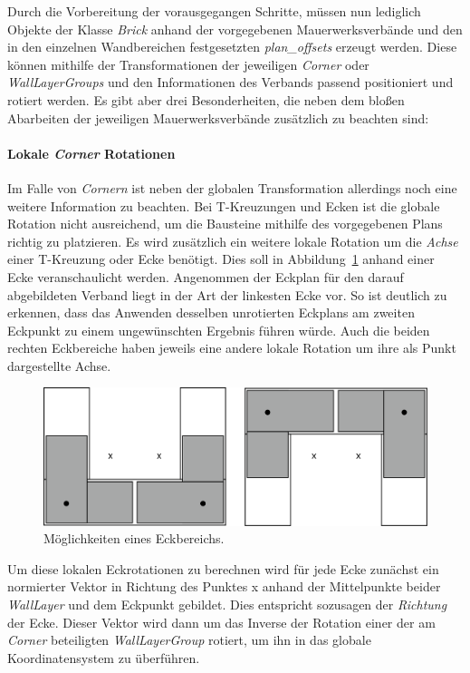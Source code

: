 Durch die Vorbereitung der vorausgegangen Schritte, müssen nun lediglich Objekte der Klasse \textit{Brick} anhand der vorgegebenen Mauerwerksverbände und den in den einzelnen Wandbereichen festgesetzten \textit{plan\_offsets} erzeugt werden.
Diese können mithilfe der Transformationen der jeweiligen \textit{Corner} oder \textit{WallLayerGroups} und den Informationen des Verbands passend positioniert und rotiert werden.
Es gibt aber drei Besonderheiten, die neben dem bloßen Abarbeiten der jeweiligen Mauerwerksverbände zusätzlich zu beachten sind:

\paragraph*{Lokale \textit{Corner} Rotationen}
Im Falle von \textit{Cornern} ist neben der globalen Transformation allerdings noch eine weitere Information zu beachten.
Bei T-Kreuzungen und Ecken ist die globale Rotation nicht ausreichend, um die Bausteine mithilfe des vorgegebenen Plans richtig zu platzieren.
Es wird zusätzlich ein weitere lokale Rotation um die \textit{Achse} einer T-Kreuzung oder Ecke benötigt.
Dies soll in Abbildung~\ref{fig:real:eckrotationen} anhand einer Ecke veranschaulicht werden.
Angenommen der Eckplan für den darauf abgebildeten Verband liegt in der Art der linkesten Ecke vor.
So ist deutlich zu erkennen, dass das Anwenden desselben unrotierten Eckplans am zweiten Eckpunkt zu einem ungewünschten Ergebnis führen würde.
Auch die beiden rechten Eckbereiche haben jeweils eine andere lokale Rotation um ihre als Punkt dargestellte Achse.
\begin{figure}[hb]
  \centering
  \includegraphics[width=0.9\columnwidth]{fig/Eckrotationen.png}
  \caption{Möglichkeiten eines Eckbereichs.}
  \label{fig:real:eckrotationen}
\end{figure}
Um diese lokalen Eckrotationen zu berechnen wird für jede Ecke zunächst ein normierter Vektor in Richtung des Punktes x anhand der Mittelpunkte beider \textit{WallLayer} und dem Eckpunkt gebildet.
Dies entspricht sozusagen der \textit{Richtung} der Ecke.
Dieser Vektor wird dann um das Inverse der Rotation einer der am \textit{Corner} beteiligten \textit{WallLayerGroup} rotiert, um ihn in das globale Koordinatensystem zu überführen.
